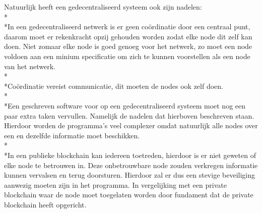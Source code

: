 \documentclass[fleqn,a4paper,12pt]{book}
\begin{document}
Natuurlijk heeft een gedecentraliseerd systeem ook zijn nadelen:\\*\\*In een gedecentraliseerd netwerk is er geen coördinatie door een centraal punt, daarom moet er rekenkracht opzij gehouden worden zodat elke node dit zelf kan doen. Niet zomaar elke node is goed genoeg voor het netwerk, zo moet een node voldoen aan een minium specificatie om zich te kunnen voorstellen als een node van het netwerk.\\*\\*Coördinatie vereist communicatie, dit moeten de nodes ook zelf doen.\\*\\*Een geschreven software voor op een gedecentraliseerd systeem moet nog een paar extra taken vervullen. Namelijk de nadelen dat hierboven beschreven staan. Hierdoor worden de programma's veel complexer omdat natuurlijk alle nodes over een en dezelfde informatie moet beschikken.\\*\\*In een publieke blockchain kan iedereen toetreden, hierdoor is er niet geweten of elke node te betrouwen in. Deze onbetrouwbare node zouden verkregen informatie kunnen vervalsen en terug doorsturen. Hierdoor zal er dus een stevige beveiliging aanwezig moeten zijn in het programma. In vergelijking met een private blockchain waar de node moet toegelaten worden door fundament dat de private blockchain heeft opgericht.
\end{document}
